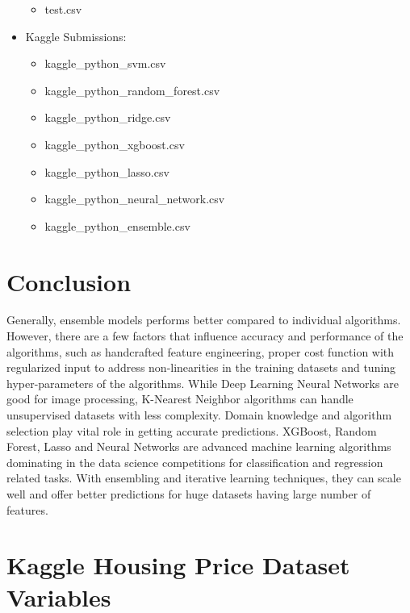\documentclass[sigconf]{acmart}
\begin{document}
\begin{itemize}
\begin{itemize}
			\item test.csv
		\end{itemize}  
		\item Kaggle Submissions:
		\begin{itemize}
			\item kaggle\_python\_svm.csv
			\item kaggle\_python\_random\_forest.csv
			\item kaggle\_python\_ridge.csv
			\item kaggle\_python\_xgboost.csv
			\item kaggle\_python\_lasso.csv
			\item kaggle\_python\_neural\_network.csv
			\item kaggle\_python\_ensemble.csv
		\end{itemize}    	
	\end{itemize}    
	
	
	\section{Conclusion}
	
	Generally, ensemble models performs better compared to individual algorithms. However, there are a few factors that influence accuracy and performance of the algorithms, such as handcrafted feature engineering, proper cost function with regularized input to address non-linearities in the training datasets and tuning hyper-parameters of the algorithms. While Deep Learning Neural Networks are good for image processing, K-Nearest Neighbor algorithms can handle unsupervised datasets with less complexity. Domain knowledge and algorithm selection play vital role in getting accurate predictions. XGBoost, Random Forest, Lasso and Neural Networks are advanced machine learning algorithms dominating in the data science competitions for classification and regression related tasks. With ensembling and iterative learning techniques, they can scale well and offer better predictions for huge datasets having large number of features. 
	
	\appendix
	
	\section{Kaggle Housing Price Dataset Variables}
	
\end{document}
